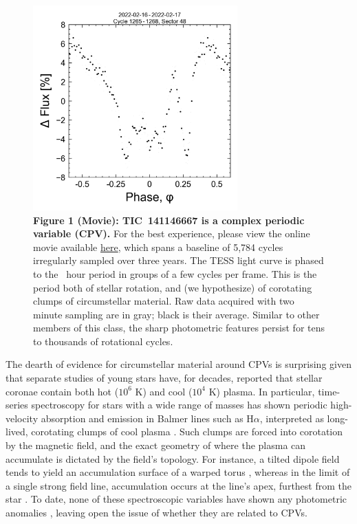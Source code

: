 \documentclass{nature3}
\begin{document}
\begin{figure}[!t]
  \centering
  \includegraphics[width=0.7\textwidth]{figures/f1.png}
  \caption[]{{\bf Figure 1 (Movie):  TIC~141146667 is a complex periodic
  variable (CPV).} For the best experience, please view the online movie
  available
  \href{https://lgbouma.com/movies/TIC141146667_20250116.mp4}{here},
  which spans a baseline of 5{,}784 cycles irregularly sampled over three
  years.  The TESS light curve is phased to the \periodhr\ hour period in
  groups of a few cycles per frame.  This is the period both of
  stellar rotation, and (we hypothesize) of corotating clumps of
  circumstellar material.  Raw data acquired with two minute
  sampling are in gray; black is their average.  Similar to other members
  of this class, the sharp photometric features persist for tens to
  thousands of rotational cycles. }
  \label{fig:lc}
\end{figure}


The dearth of evidence for circumstellar material around CPVs is
surprising given that separate studies of young stars have, for
decades, reported that stellar coronae contain both hot ($10^6$ K) and
cool ($10^4$ K) plasma. In particular, time-series spectroscopy for
stars with a wide range of masses has shown periodic high-velocity
absorption and emission in Balmer lines such as H$\alpha$, interpreted
as long-lived, corotating clumps of cool plasma
\cite{CollierCameron1989,Donati2000,Dunstone2006,Skelly2008}.
Such clumps are forced into corotation by the magnetic field, and the
exact geometry of where the plasma can accumulate is dictated by the
field's topology.  For instance, a tilted dipole field tends
to yield an accumulation surface of a warped torus
\cite{Townsend2005}, whereas in the limit of a single strong field
line, accumulation occurs at the line's apex, furthest from the star
\cite{Waugh2022}.
To date, none of these spectroscopic variables have shown any
photometric anomalies \cite{Bouma2024}, leaving open the issue of
whether they are related to CPVs.
\end{document}
